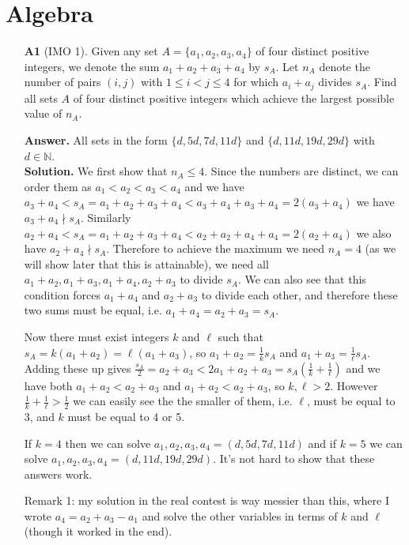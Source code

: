 \documentclass[11pt,a4paper]{article}
\begin{document}
\newcommand{\la}{\leftarrow}
\newcommand{\lra}{\leftrightarrow}
\newcommand{\bbN}{\mathbb{N}}
\newcommand{\dsum}{\displaystyle\sum}
\newcommand{\dprod}{\displaystyle\prod}


\section*{Algebra}
\begin{enumerate}
	\item [\textbf{A1}] (IMO 1). Given any set $A = \{a_1, a_2, a_3, a_4\}$ of four distinct positive integers, we denote the sum $a_1 +a_2 +a_3 +a_4$ by $s_A$. Let $n_A$ denote the number of pairs $(i, j)$ with $1 \leq  i < j \leq 4$ for which $a_i +a_j$ divides $s_A$. Find all sets $A$ of four distinct positive integers which achieve the largest possible value of $n_A$.
	
	\textbf{Answer.} All sets in the form $\{d, 5d, 7d, 11d\}$ and $\{d, 11d, 19d, 29d\}$ with $d\in\bbN$. \\
	\textbf{Solution.} We first show that $n_A\le 4$. Since the numbers are distinct, we can order them as $a_1<a_2<a_3<a_4$ and we have $a_3+a_4<s_A=a_1+a_2+a_3+a_4<a_3+a_4+a_3+a_4=2(a_3+a_4)$ we have $a_3+a_4\nmid s_A$. Similarly $a_2+a_4<s_A=a_1+a_2+a_3+a_4<a_2+a_2+a_4+a_4=2(a_2+a_4)$ we also have $a_2+a_4\nmid s_A$. 
	Therefore to achieve the maximum we need $n_A=4$ (as we will show later that this is attainable), we need all $a_1+a_2, a_1+a_3, a_1+a_4, a_2+a_3$ to divide $s_A$. We can also see that this condition forces $a_1+a_4$ and $a_2+a_3$ to divide each other, and therefore these two sums must be equal, i.e. $a_1+a_4=a_2+a_3=s_A$. 
	
	Now there must exist integers $k$ and $\ell$ such that $s_A=k(a_1+a_2)=\ell(a_1+a_3)$, so $a_1+a_2=\frac 1k s_A$ and $a_1+a_3=\frac 1{\ell} s_A$. Adding these up gives $\frac {s_A}{2}=a_2+a_3<2a_1+a_2+a_3=s_A(\frac 1k + \frac 1{\ell})$ and we have both $a_1+a_2<a_2+a_3$ and $a_1+a_2<a_2+a_3$, so $k, \ell>2$. However $\frac 1k + \frac 1{\ell}>\frac 12$ we can easily see the the smaller of them, i.e. $\ell$, must be equal to 3, and $k$ must be equal to 4 or 5. 
	
	If $k=4$ then we can solve $a_1, a_2, a_3, a_4=(d, 5d, 7d, 11d)$ and if $k=5$ we can solve $a_1, a_2, a_3, a_4=(d, 11d, 19d, 29d)$. It's not hard to show that these answers work. 
	
	Remark 1: my solution in the real contest is way messier than this, where I wrote $a_4=a_2+a_3-a_1$ and solve the other variables in terms of $k$ and $\ell$ (though it worked in the end). 
	

\end{enumerate}
\end{document}
